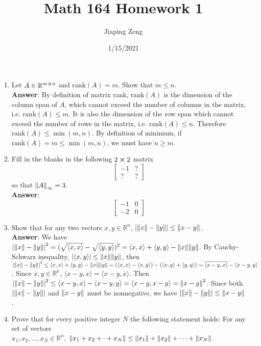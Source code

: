 \documentclass{article}
\title{Math 164 Homework 1}
\date{1/15/2021}
\author{Jiaping Zeng}
\begin{document}
\maketitle

\begin{enumerate}
    \item Let $A\in\mathbb{R}^{m\cross n}$ and $\text{rank}(A)=m$. Show that $m\leq n$.\\
          \textbf{Answer}: By definition of matrix rank, $\text{rank}(A)$ is the dimension of the column span of $A$, which cannot exceed the number of columns in the matrix, i.e. $\text{rank}(A)\leq m$. It is also the dimension of the row span which cannot exceed the number of rows in the matrix, i.e. $\text{rank}(A)\leq n$. Therefore $\text{rank}(A)\leq\min(m,n)$. By definition of minimum, if $\text{rank}(A)=m\leq\min(m,n)$, we must have $n\geq m$.
    \item Fill in the blanks in the following $2\cross 2$ matrix \[\begin{bmatrix}-1&?\\?&?\end{bmatrix}\] so that $\norm{A}_\infty=3$.\\
          \textbf{Answer}: \[\begin{bmatrix}-1&0\\-2&0\end{bmatrix}\]
    \item Show that for any two vectors $x,y\in\mathbb{R}^n$, $\abs{\norm{x}-\norm{y}}\leq\norm{x-y}$.\\
          \textbf{Answer}: We have $\abs{\norm{x}-\norm{y}}^2=(\sqrt{\langle x,x\rangle}-\sqrt{\langle y,y\rangle})^2=\langle x,x\rangle+\langle y,y\rangle-\norm{x}\norm{y}$. By Cauchy-Schwarz inequality, $\abs{\langle x,y\rangle}\leq\norm{x}\norm{y}$, then $\abs{\norm{x}-\norm{y}}^2\leq \langle x,x\rangle+\langle y,y\rangle-\norm{x}\norm{y}=(\langle x,x\rangle-\langle x,y\rangle)-(\langle x,y\rangle+\langle y,y\rangle)=\overline{\langle x-y,x\rangle}-\langle x-y,y\rangle$. Since $x,y\in\mathbb{R^n}$, $\overline{\langle x-y,x\rangle}=\langle x-y,x\rangle$. Then $\abs{\norm{x}-\norm{y}}^2\leq\langle x-y,x\rangle-\langle x-y,y\rangle=\langle x-y,x-y\rangle=\norm{x-y}^2$. Since both $\abs{\norm{x}-\norm{y}}$ and $\norm{x-y}$ must be nonnegative, we have $\abs{\norm{x}-\norm{y}}\leq \norm{x-y}$.
    \item Prove that for every positive integer $N$ the following statement holds: For any set of vectors\\$x_1,x_2,\ldots,x_N\in\mathbb{R}^n$, $\norm{x_1+x_2+\cdot+x_N}\leq\norm{x_1}+\norm{x_2}+\cdots+\norm{x_N}$.\\

\end{enumerate}
\end{document}

